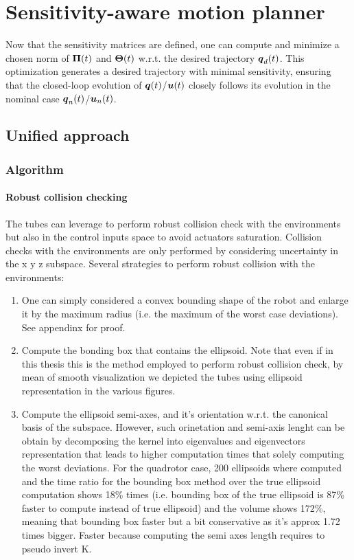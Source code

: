 \chapter{Sensitivity-aware motion planner}

Now that the sensitivity matrices are defined, one can compute and minimize a chosen norm of $\boldsymbol{\Pi}(t)$ and $\boldsymbol{\Theta}(t)$ w.r.t. the desired trajectory $\boldsymbol{q}_d(t)$. 
This optimization generates a desired trajectory with minimal sensitivity, ensuring that the closed-loop evolution of $\boldsymbol{q}(t)$/$\boldsymbol{u}(t)$ closely follows its evolution in the nominal case $\boldsymbol{q}_n(t)$/$\boldsymbol{u}_n(t)$.

\section{Unified approach}
\subsection{Algorithm}
\subsubsection{Robust collision checking}
The tubes can leverage to perform robust collision check with the environments but also in the control inputs space to avoid actuators saturation. 
Collision checks with the environments are only performed by considering uncertainty in the x y z subspace.
Several strategies to perform robust collision with the environments:
\begin{enumerate}
    \item One can simply considered a convex bounding shape of the robot and enlarge it by the maximum radius (i.e. the maximum of the worst case deviations). See appendinx for proof.
    \item Compute the bonding box that contains the ellipsoid. Note that even if in this thesis this is the method employed to perform robust collision check, by mean of smooth visualization we depicted the tubes using ellipsoid representation in the various figures.
    \item Compute the ellipsoid semi-axes, and it's orientation w.r.t. the canonical basis of the subspace. However, such orinetation and semi-axis lenght can be obtain by decomposing the kernel into eigenvalues and eigenvectors representation that leads to higher computation times that solely computing the worst deviations. For the quadrotor case, 200 ellipsoids where computed and the time ratio for the bounding box method over the true ellipsoid computation shows 18\% times (i.e. bounding box of the true ellipsoid is 87\% faster to compute instead of true ellipsoid) and the volume shows 172\%, meaning that bounding box faster but a bit conservative as it's approx 1.72 times bigger. Faster because computing the semi axes length requires to pseudo invert K.
\end{enumerate}
